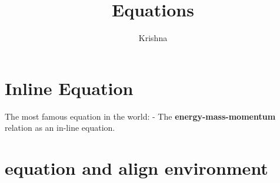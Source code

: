 \documentclass{article}
\title{Equations}
\author{Krishna}
\date{}
\begin{document}
\maketitle

\section*{Inline Equation}


The most famous equation in the world:  - The \textbf{energy-mass-momentum} relation as an in-line equation.

\section{equation and align environment}





\end{document}
